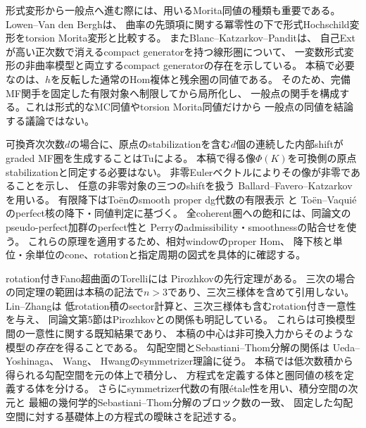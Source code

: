 形式変形から一般点へ進む際には、用いるMorita同値の種類も重要である。
Lowen--Van den Bergh\cite[Theorem~5.4]{LowenVdBCurvature}は、
曲率の先頭項に関する冪零性の下で形式Hochschild変形をtorsion Morita変形と比較する。
またBlanc--Katzarkov--Pandit\cite[Theorems~1.1, 1.2]{BKPGenerators}は、
自己Extが高い正次数で消えるcompact generatorを持つ線形圏について、
一変数形式変形の非曲率模型と両立するcompact generatorの存在を示している。
本稿で必要なのは、$h$を反転した通常のHom複体と残余圏の同値である。
そのため、完備MF関手を固定した有限対象へ制限してから局所化し、
一般点の関手を構成する。これは形式的なMC同値やtorsion Morita同値だけから
一般点の同値を結論する議論ではない。

可換斉次次数$d$の場合に、原点のstabilizationを含む$d$個の連続した内部shiftが
graded MF圏を生成することはTu\cite[Theorems~1.4, 6.2]{TuKoszul}による。
本稿で得る像$\Phi(K)$を可換側の原点stabilizationと同定する必要はない。
非零Eulerベクトルによりその像が非零であることを示し、
任意の非零対象の三つのshiftを扱う
Ballard--Favero--Katzarkov\cite[Theorem~5.15]{GCDBFK}を用いる。
有限降下はToënのsmooth proper dg代数の有限表示
\cite[Th\'eor\`eme~1]{ROGToenDefinition}と
Toën--Vaquiéのperfect核の降下・同値判定\cite[Lemmas~2.10, 3.25]{ROGTV}に基づく。
全coherent圏への飽和には、同論文のpseudo-perfect加群のperfect性と
Perryのadmissibility・smoothnessの貼合せ\cite[Lemmas~4.13, 4.15]{CRSPerry}を使う。
これらの原理を適用するため、相対windowのproper Hom、
降下核と単位・余単位のcone、rotationと指定周期の図式を具体的に確認する。

rotation付きFano超曲面のTorelliには
Pirozhkov\cite[Theorem~1.2]{PirozhkovTorelli}の先行定理がある。
三次の場合の同定理の範囲は本稿の記法で$n>3$であり、三次三様体を含めて引用しない。
Lin--Zhang\cite[Theorem~3.5, Remark~3.6, Theorem~5.1]{LZ}は
低rotation積のsector計算と、三次三様体も含むrotation付き一意性を与え、
同論文第5節はPirozhkovとの関係も明記している。
これらは可換模型間の一意性に関する既知結果であり、
本稿の中心は非可換入力からそのような模型の\emph{存在}を得ることである。
勾配空間とSebastiani--Thom分解の関係は
Ueda--Yoshinaga\cite[Lemma~3]{UedaYoshinaga}、
Wang\cite[Theorem~1.1]{WangJacobian}、
Hwang\cite{HwangSymmetrizer}のsymmetrizer理論に従う。
本稿では低次数積から得られる勾配空間を元の体上で積分し、
方程式を定義する体と圏同値の核を定義する体を分ける。
さらにsymmetrizer代数の有限\'etale性を用い、積分空間の次元と
最細の幾何学的Sebastiani--Thom分解のブロック数の一致、
固定した勾配空間に対する基礎体上の方程式の曖昧さを記述する。

